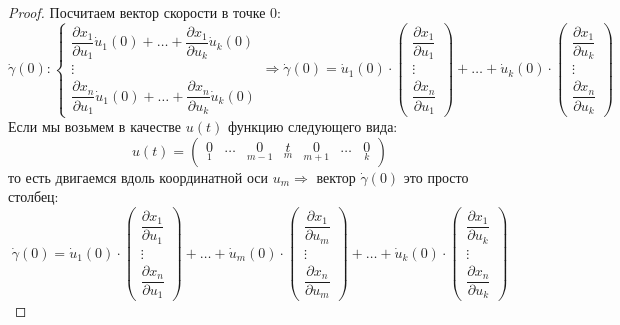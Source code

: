 \documentclass[12pt]{article}
\theoremstyle{definition}
\begin{document}
\begin{proof}
	 Посчитаем вектор скорости в точке $0$:
	 $$
	 	\dot{\gamma}(0)\colon \left\{
	 	\begin{array}{c}
	 		\dfrac{\partial x_1}{\partial u_1}\dot{u}_1(0) + \dotsc +  \dfrac{\partial x_1}{\partial u_k}\dot{u}_k(0)\\
		 	\vdots \\
	 		\dfrac{\partial x_n}{\partial u_1}\dot{u}_1(0) + \dotsc +  \dfrac{\partial x_n}{\partial u_k}\dot{u}_k(0)
	 	\end{array}\right. \Rightarrow
	 	\dot{\gamma}(0) = \dot{u}_1(0){\cdot}\!\!
	 	\begin{pmatrix}
			\dfrac{\partial x_1}{\partial u_1}\\
			\vdots\\
			\dfrac{\partial x_n}{\partial u_1}
	 	\end{pmatrix} 
	 	+ \dotsc + \dot{u}_k(0){\cdot}\!\!
		 \begin{pmatrix}
	 		\dfrac{\partial x_1}{\partial u_k}\\
	 		\vdots\\
	 		\dfrac{\partial x_n}{\partial u_k}
	 	\end{pmatrix}
	 $$
	 Если мы возьмем в качестве $u(t)$ функцию следующего вида:
	 $$
	 	u(t) = \begin{pmatrix}
	 		\underset{1}{0} & \dotsc & \underset{m-1}{0} & \underset{m}{t} & \underset{m+1}{0} & \dotsc & \underset{k}{0}
	 	\end{pmatrix}
	 $$
	 то есть двигаемся вдоль координатной оси $u_m \Rightarrow$ вектор $\dot{\gamma}(0)$ это просто столбец:
	 $$
	 	\dot{\gamma}(0) = \dot{u}_1(0){\cdot}\!\!
	 	\begin{pmatrix}
	 		\dfrac{\partial x_1}{\partial u_1}\\
	 		\vdots\\
	 		\dfrac{\partial x_n}{\partial u_1}
	 	\end{pmatrix} + \dotsc + 
	 	\dot{u}_m(0){\cdot}\!\!	\begin{pmatrix}
	 		\dfrac{\partial x_1}{\partial u_m}\\
	 		\vdots\\
	 		\dfrac{\partial x_n}{\partial u_m}
	 	\end{pmatrix} 
 		+ \dotsc + \dot{u}_k(0){\cdot}\!\!
 		\begin{pmatrix}
 			\dfrac{\partial x_1}{\partial u_k}\\
 			\vdots\\
 			\dfrac{\partial x_n}{\partial u_k}
 		\end{pmatrix} 
$$
\end{proof}
\end{document}
